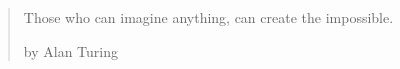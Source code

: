 

\pagestyle{empty}

\vspace*{\fill}
\thispagestyle{empty}
\begin{quotation}
	\em 
	\begin{flushright}
		Those who can imagine anything, can create the impossible.
	\end{flushright}
	
	\medskip
	\raggedleft
	by Alan Turing 
\end{quotation}
\vspace*{\fill}